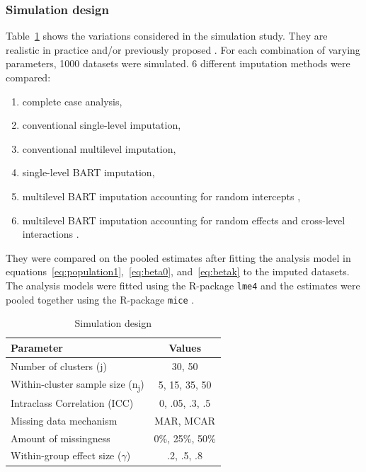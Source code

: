 \documentclass[10pt, a4paper, titlepage]{article}
\begin{document}
\subsubsection{Simulation design} 
Table~\ref{tab:simulationparameters} shows the variations considered in the simulation study. They are realistic in practice and/or previously proposed \citep{gulliford1999, murray2003, hox2017, grund2018, enders2018a, enders2020}. For each combination of varying parameters, 1000 datasets were simulated. 6 different imputation methods were compared: 
\begin{enumerate}
    \item complete case analysis,
    \item conventional single-level imputation,
    \item conventional multilevel imputation,
    \item single-level BART imputation,
    \item multilevel BART imputation accounting for random intercepts \citep{chen2020, wagner2020, tan2016, wundervald2022},
    \item multilevel BART imputation accounting for random effects and cross-level interactions \citep{dorie2022}.
\end{enumerate} They were compared on the pooled estimates after fitting the analysis model in equations~\ref{eq:population1},~\ref{eq:beta0}, and~\ref{eq:betak} to the imputed datasets. The analysis models were fitted using the R-package \texttt{lme4} \citep{bates2015} and the estimates were pooled together using the R-package \texttt{mice} \citep{buuren2011}.
\begin{table}
\centering
\caption{Simulation design}
\label{tab:simulationparameters}
\begin{tabular}{l|c}
        \textbf{Parameter}                                  & \textbf{Values} \\ \hline
        Number of clusters (j)                              & 30, 50          \\
        Within-cluster sample size (n\textsubscript{j})     & 5, 15, 35, 50   \\
        Intraclass Correlation (ICC)                        & 0, .05, .3, .5  \\
        Missing data mechanism                              & MAR, MCAR       \\
        Amount of missingness                               & 0\%, 25\%, 50\% \\
        Within-group effect size ($\gamma$)                 & .2, .5, .8
\end{tabular}
\end{table} 
\end{document}
